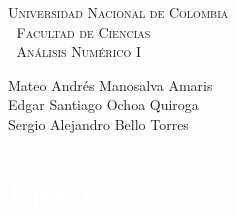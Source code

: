 \documentclass[12pt, a4paper]{article}%
\begin{document}
\setlength{\parindent}{0cm}
\hoffset-0.46cm
\voffset-1.46cm

\begin{window}
\large\scshape  \hspace{0.4cm}\textsf{Universidad Nacional de Colombia} \\
\textcolor{white}{\tiny.}  \large \hspace{1.5cm} \textsf{Facultad de Ciencias} \\
\textcolor{white}{\tiny.}   \normalsize\hspace{2.2cm}\textsf{Análisis Numérico I}\\
 

\end{window}

\vspace{0.2cm}
\small
\textsf{Mateo Andrés Manosalva Amaris\\
Edgar Santiago Ochoa Quiroga\\
Sergio Alejandro Bello Torres} 
\normalsize
\dotfill
\vspace{0.7cm}

\section*{\textcolor{white}{Ejercicios}}
\vspace*{-2cm} %







\end{document}
